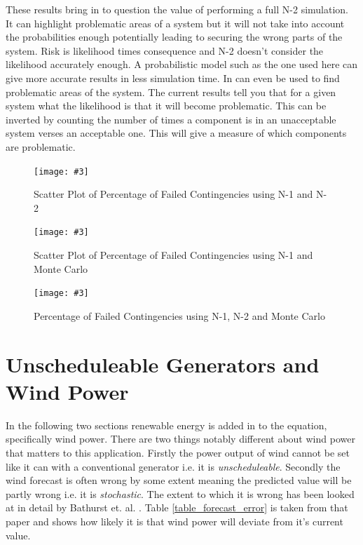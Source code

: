 \documentclass[a4paper,oneside,12pt]{report}
\newcommand{\image}[3] {
  \begin{figure}
    \begin{center}
      \texttt{[image: \#3]}
      \caption{#2}
      \label{#1}
    \end{center}
  \end{figure}
}
\begin{document}
These results bring in to question the value of performing a full N-2 simulation. It can highlight problematic areas of a system but it will not take into account the probabilities enough potentially leading to securing the wrong parts of the system. Risk is likelihood times consequence and N-2 doesn't consider the likelihood accurately enough. A probabilistic model such as the one used here can give more accurate results in less simulation time. In can even be used to find problematic areas of the system. The current results tell you that for a given system what the likelihood is that it will become problematic. This can be inverted by counting the number of times a component is in an unacceptable system verses an acceptable one. This will give a measure of which components are problematic.

\image{scatter-n1-n2}{Scatter Plot of Percentage of Failed Contingencies using N-1 and N-2}{scatter-n1-n2.png}
\image{scatter-mc-n2}{Scatter Plot of Percentage of Failed Contingencies using N-1 and Monte Carlo}{scatter-mc-n2.png}
\image{mc-n1-n2}{Percentage of Failed Contingencies using N-1, N-2 and Monte Carlo}{mc-n1-n2.png}
\clearpage

\section{Unscheduleable Generators and Wind Power}

In the following two sections renewable energy is added in to the equation, specifically wind power. There are two things notably different about wind power that matters to this application. Firstly the power output of wind cannot be set like it can with a conventional generator i.e. it is \emph{unscheduleable}. Secondly the wind forecast is often wrong by some extent meaning the predicted value will be partly wrong i.e. it is \emph{stochastic}. The extent to which it is wrong has been looked at in detail by Bathurst et. al. \cite{Bathurst2002}. Table \ref{table_forecast_error} is taken from that paper and shows how likely it is that wind power will deviate from it's current value. 
\end{document}
